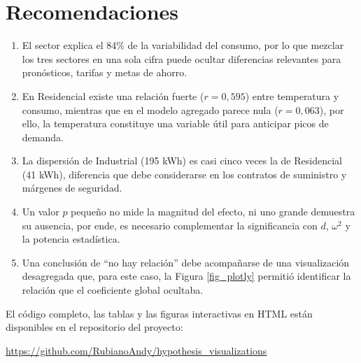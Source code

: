 \section{Recomendaciones}
    \begin{enumerate}
        \item El sector explica el 84\% de la variabilidad del consumo,
        por lo que mezclar los tres sectores en una sola cifra puede ocultar
        diferencias relevantes para pronósticos, tarifas y metas de ahorro.
        
        \vspace{5pt}
        
        \item En Residencial existe una relación fuerte ($r=0{,}595$) entre
        temperatura y consumo, mientras que en el modelo agregado parece nula
        ($r=0{,}063$), por ello, la temperatura constituye una variable útil
        para anticipar picos de demanda.
        
        \vspace{5pt}
        
        \item La dispersión de Industrial (195 kWh) es casi cinco veces la de
        Residencial (41 kWh), diferencia que debe considerarse en los contratos
        de suministro y márgenes de seguridad.
        
        \vspace{5pt}
        
        \item Un valor $p$ pequeño no mide la magnitud del efecto, ni uno
        grande demuestra su ausencia, por ende, es necesario complementar la
        significancia con $d$, $\omega^2$ y la potencia estadística.
        
        \vspace{5pt}
        
        \item Una conclusión de ``no hay relación'' debe acompañarse de una
        visualización desagregada que, para este caso, la Figura \ref{fig_plotly}
        permitió identificar la relación que el coeficiente global ocultaba.
    \end{enumerate}

    \vspace{10pt}

    El código completo, las tablas y las figuras interactivas en HTML
    están disponibles en el repositorio del proyecto:

    \begin{center}
        \begin{tcolorbox}[
            arc=0pt, boxrule=0.8pt,
            colback=white, colframe=green!45!black,
            colbacktitle=green!45!black, coltitle=white,
            fonttitle=\bfseries,
            title=Repositorio del proyecto en GitHub,
            halign=center, halign title=center,
            width=0.92\linewidth
        ]
            \small
            \url{https://github.com/RubianoAndy/hypothesis_visualizations}
        \end{tcolorbox}
    \end{center}
